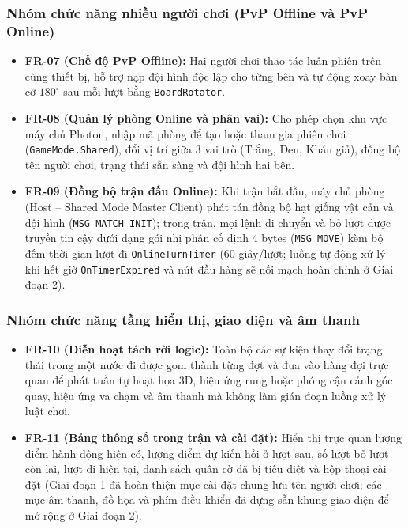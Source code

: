 \subsubsection{Nhóm chức năng nhiều người chơi (PvP Offline và PvP Online)}
\begin{itemize}
    \item \textbf{FR-07 (Chế độ PvP Offline):} Hai người chơi thao tác luân phiên trên cùng thiết bị, hỗ trợ nạp đội hình độc lập cho từng bên và tự động xoay bàn cờ $180^\circ$ sau mỗi lượt bằng \texttt{BoardRotator}.
    \item \textbf{FR-08 (Quản lý phòng Online và phân vai):} Cho phép chọn khu vực máy chủ Photon, nhập mã phòng để tạo hoặc tham gia phiên chơi (\texttt{GameMode.Shared}), đổi vị trí giữa 3 vai trò (Trắng, Đen, Khán giả), đồng bộ tên người chơi, trạng thái sẵn sàng và đội hình hai bên.
    \item \textbf{FR-09 (Đồng bộ trận đấu Online):} Khi trận bắt đầu, máy chủ phòng (Host -- Shared Mode Master Client) phát tán đồng bộ hạt giống vật cản và đội hình (\texttt{MSG\_MATCH\_INIT}); trong trận, mọi lệnh di chuyển và bỏ lượt được truyền tin cậy dưới dạng gói nhị phân cố định 4 bytes (\texttt{MSG\_MOVE}) kèm bộ đếm thời gian lượt đi \texttt{OnlineTurnTimer} (60 giây/lượt; luồng tự động xử lý khi hết giờ \texttt{OnTimerExpired} và nút đầu hàng sẽ nối mạch hoàn chỉnh ở Giai đoạn 2).
\end{itemize}

\subsubsection{Nhóm chức năng tầng hiển thị, giao diện và âm thanh}
\begin{itemize}
    \item \textbf{FR-10 (Diễn hoạt tách rời logic):} Toàn bộ các sự kiện thay đổi trạng thái trong một nước đi được gom thành từng đợt và đưa vào hàng đợi trực quan để phát tuần tự hoạt họa 3D, hiệu ứng rung hoặc phóng cận cảnh góc quay, hiệu ứng va chạm và âm thanh mà không làm gián đoạn luồng xử lý luật chơi.
    \item \textbf{FR-11 (Bảng thông số trong trận và cài đặt):} Hiển thị trực quan lượng điểm hành động hiện có, lượng điểm dự kiến hồi ở lượt sau, số lượt bỏ lượt còn lại, lượt đi hiện tại, danh sách quân cờ đã bị tiêu diệt và hộp thoại cài đặt (Giai đoạn 1 đã hoàn thiện mục cài đặt chung lưu tên người chơi; các mục âm thanh, đồ họa và phím điều khiển đã dựng sẵn khung giao diện để mở rộng ở Giai đoạn 2).
\end{itemize}

